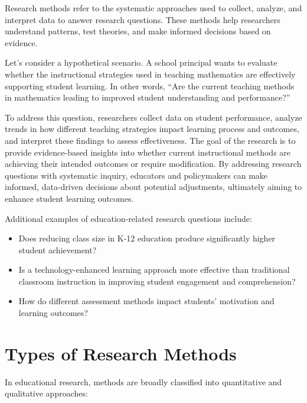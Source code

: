 \documentclass[
  letterpaper,
  DIV=11,
  numbers=noendperiod]{scrreprt}
\begin{document}
Research methods refer to the systematic approaches used to collect,
analyze, and interpret data to answer research questions. These methods
help researchers understand patterns, test theories, and make informed
decisions based on evidence.

Let's consider a hypothetical scenario. A school principal wants to
evaluate whether the instructional strategies used in teaching
mathematics are effectively supporting student learning. In other words,
``Are the current teaching methods in mathematics leading to improved
student understanding and performance?''

To address this question, researchers collect data on student
performance, analyze trends in how different teaching strategies impact
learning process and outcomes, and interpret these findings to assess
effectiveness. The goal of the research is to provide evidence-based
insights into whether current instructional methods are achieving their
intended outcomes or require modification. By addressing research
questions with systematic inquiry, educators and policymakers can make
informed, data-driven decisions about potential adjustments, ultimately
aiming to enhance student learning outcomes.

Additional examples of education-related research questions include:

\begin{itemize}
\item
  Does reducing class size in K-12 education produce significantly
  higher student achievement?
\item
  Is a technology-enhanced learning approach more effective than
  traditional classroom instruction in improving student engagement and
  comprehension?
\item
  How do different assessment methods impact students' motivation and
  learning outcomes?
\end{itemize}

\section{Types of Research Methods}\label{types-of-research-methods}

In educational research, methods are broadly classified into
quantitative and qualitative approaches:
\end{document}
